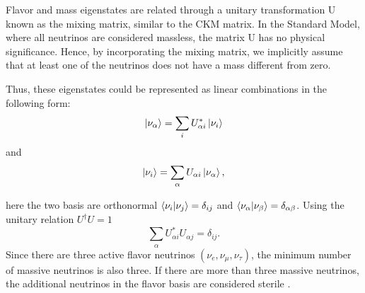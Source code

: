 Flavor and mass eigenstates are related through a unitary transformation U known as the mixing matrix, similar to the CKM matrix. In the Standard Model, where all neutrinos are considered massless, the matrix U has no physical significance. Hence, by incorporating the mixing matrix, we implicitly assume that at least one of the neutrinos does not have a mass different from zero.

Thus, these eigenstates could be represented as linear combinations in the following form:
\begin{equation}
    \ket{\nu_\alpha} = \sum_i U^*_{\alpha i} \ket{\nu_i}
\end{equation}
and
\begin{equation}
    \ket{\nu_i} = \sum_\alpha U_{\alpha i} \ket{\nu_\alpha},
    \label{masstates}
\end{equation}

here the two basis are orthonormal $\braket{\nu_i|\nu_j}=\delta_{ij}$ and $\braket{\nu_\alpha|\nu_\beta}=\delta_{\alpha \beta}$. Using the unitary relation $U^\dagger U=1$
\begin{equation}
\sum_\alpha U^*_{\alpha i} U_{\alpha j} =\delta_{ij}.
\end{equation}
Since there are three active flavor neutrinos $(\nu_e,\nu_\mu,\nu_\tau)$, the minimum number of massive neutrinos is also three. If there are more than three massive neutrinos, the additional neutrinos in the flavor basis are considered sterile \cite{10.1093/acprof:oso/9780198508717.001.0001}.

